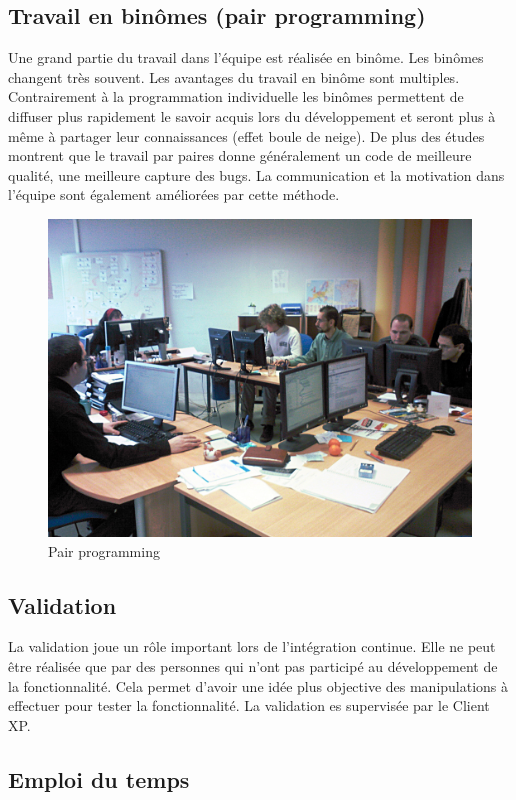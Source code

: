 \documentclass[12pt,oneside]{book}
\begin{document}
\subsection{Travail en binômes (pair programming)}
Une grand partie du travail dans l'équipe est réalisée en binôme. Les binômes changent très souvent. Les avantages du travail en binôme sont multiples. Contrairement à la programmation individuelle les binômes permettent de diffuser plus rapidement le savoir acquis lors du développement et seront plus à même à partager leur connaissances (effet boule de neige). De plus des études montrent que le travail par paires donne généralement un code de meilleure qualité, une meilleure capture des bugs. La communication et la motivation dans l'équipe sont également améliorées par cette méthode.
\begin{figure}[!h]
\centering
\includegraphics[scale=0.15]{Illustrations/SP_A0188.jpg}
\caption{Pair programming}
\label{fig:Pair programming}
\end{figure}
\subsection{Validation}
La validation joue un rôle important lors de l'intégration continue. Elle ne peut être réalisée que par des personnes qui n'ont pas participé au développement de la fonctionnalité. Cela permet d'avoir une idée plus objective des manipulations à effectuer pour tester la fonctionnalité. La validation es supervisée par le Client XP.


\subsection{Emploi du temps}
\end{document}
